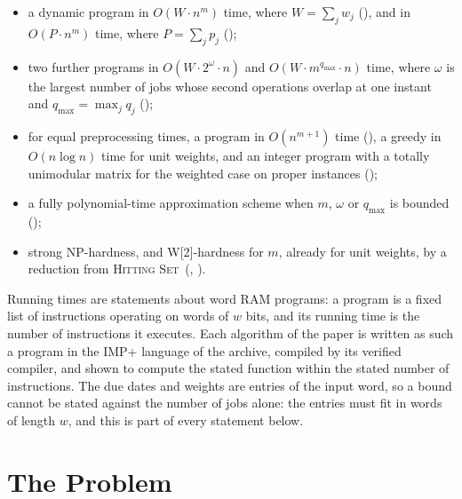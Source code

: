 \documentclass[11pt,a4paper]{article}
\theoremstyle{definition}
\theoremstyle{plain}
\newcommand{\qmax}{q_{\max}}
\newcommand{\HS}{\textsc{Hitting Set}}
\newcommand{\NP}{\textnormal{\textsf{NP}}}
\newcommand{\Wtwo}{\textnormal{\textsf{W[2]}}}
\begin{document}
\begin{itemize}
\item a dynamic program in $O(W\cdot n^m)$ time, where $W=\sum_jw_j$ (), and
  in $O(P\cdot n^m)$ time, where $P=\sum_jp_j$ ();
\item two further programs in $O(W\cdot2^{\omega}\cdot n)$ and $O(W\cdot m^{\qmax}\cdot n)$ time,
  where $\omega$ is the largest number of jobs whose second operations overlap at one instant
  and $\qmax=\max_jq_j$ ();
\item for equal preprocessing times, a program in $O(n^{m+1})$ time (), a
  greedy in $O(n\log n)$ time for unit weights, and an integer program with a totally
  unimodular matrix for the weighted case on proper instances ();
\item a fully polynomial-time approximation scheme when $m$, $\omega$ or $\qmax$ is bounded
  ();
\item strong \NP-hardness, and \Wtwo-hardness for $m$, already for unit weights, by a reduction
  from \HS\ (, ).
\end{itemize}

Running times are statements about word RAM programs: a program is a fixed list of instructions
operating on words of $w$ bits, and its running time is the number of instructions it executes.
Each algorithm of the paper is written as such a program in the IMP+ language of the archive,
compiled by its verified compiler, and shown to compute the stated function within the stated
number of instructions. The due dates and weights are entries of the input word, so a bound
cannot be stated against the number of jobs alone: the entries must fit in words of length
$w$, and this is part of every statement below.

\section{The Problem}\label{sec:model}
\end{document}

